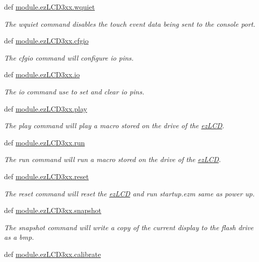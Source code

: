 \begin{DoxyCompactItemize}
def \hyperlink{group___general_gae760b8839f85e30c2a294a593e77b9d7}{module.\-ez\-L\-C\-D3xx.\-wquiet}
\begin{DoxyCompactList}\small\item\em The wquiet command disables the touch event data being sent to the console port. \end{DoxyCompactList}\item 
def \hyperlink{group___general_ga84837123679c1b262b8bb29108019dda}{module.\-ez\-L\-C\-D3xx.\-cfgio}
\begin{DoxyCompactList}\small\item\em The cfgio command will configure io pins. \end{DoxyCompactList}\item 
def \hyperlink{group___general_gad7ece2d1355d0be3f7df9ce216cb5286}{module.\-ez\-L\-C\-D3xx.\-io}
\begin{DoxyCompactList}\small\item\em The io command use to set and clear io pins. \end{DoxyCompactList}\item 
def \hyperlink{group___general_ga7d904406a210cad98e2d762dae76d553}{module.\-ez\-L\-C\-D3xx.\-play}
\begin{DoxyCompactList}\small\item\em The play command will play a macro stored on the drive of the \hyperlink{classmodule_1_1ez_l_c_d3xx_1_1ez_l_c_d}{ez\-L\-C\-D}. \end{DoxyCompactList}\item 
def \hyperlink{group___general_ga0535965cf75c9a6f4f6039a1d1399d81}{module.\-ez\-L\-C\-D3xx.\-run}
\begin{DoxyCompactList}\small\item\em The run command will run a macro stored on the drive of the \hyperlink{classmodule_1_1ez_l_c_d3xx_1_1ez_l_c_d}{ez\-L\-C\-D}. \end{DoxyCompactList}\item 
def \hyperlink{group___general_gad09d3f52045f116eb41726211f8909a4}{module.\-ez\-L\-C\-D3xx.\-reset}
\begin{DoxyCompactList}\small\item\em The reset command will reset the \hyperlink{classmodule_1_1ez_l_c_d3xx_1_1ez_l_c_d}{ez\-L\-C\-D} and run startup.\-ezm same as power up. \end{DoxyCompactList}\item 
def \hyperlink{group___general_gaf906c49e26bdd7b09f58d80675a0d4f5}{module.\-ez\-L\-C\-D3xx.\-snapshot}
\begin{DoxyCompactList}\small\item\em The snapshot command will write a copy of the current display to the flash drive as a bmp. \end{DoxyCompactList}\item 
\hypertarget{group___general_ga44f3daeee41eaaf35752594e6543a619}{def \hyperlink{group___general_ga44f3daeee41eaaf35752594e6543a619}{module.\-ez\-L\-C\-D3xx.\-calibrate}}\label{group___general_ga44f3daeee41eaaf35752594e6543a619}


\end{DoxyCompactItemize}

